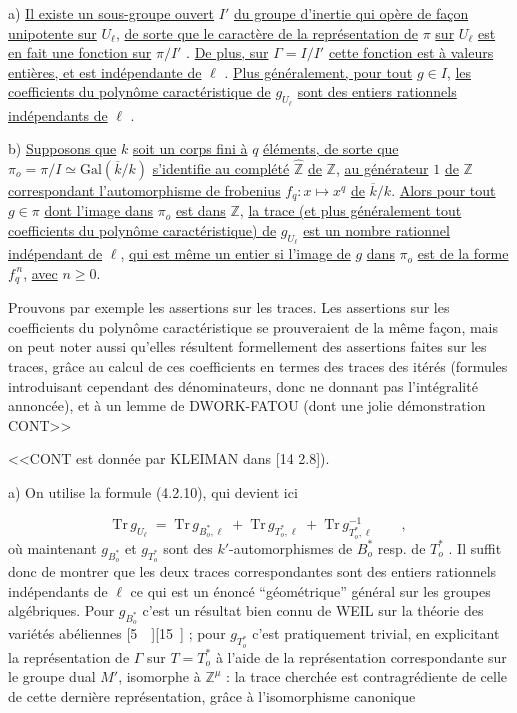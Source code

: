 a) \underline{Il existe un sous-groupe ouvert} $I'$ \underline{du groupe d'inertie qui opère de façon unipotente sur} $U_\ell$, \underline{de sorte que le caractère de la représentation de} $\pi$ \underline{sur} $U_\ell$ \underline{est en fait une fonction sur} $\pi/I'$ . \underline{De plus, sur} $\Gamma = I/I'$ \underline{cette fonction est à valeurs entières, et est indépendante de} $\ell$ . \underline{Plus généralement, pour tout} $g \in I$, \underline{les coefficients du polynôme caractéristique de} $g_{U_\ell}$ \underline{sont des entiers rationnels indépendants de} $\ell$ .

b) \underline{Supposons que} $k$ \underline{soit un corps fini à} $q$ \underline{éléments, de sorte que} $\pi_o = \pi/I \simeq \mathrm{Gal}(\overline{k}/k)$ \underline{s'identifie au complété} $\widehat{\mathbb{Z}}$ \underline{de} $\mathbb{Z}$, \underline{au générateur} $1$ \underline{de} $\mathbb{Z}$ \underline{correspondant l'automorphisme de frobenius} $f_q : x \longmapsto x^q$ \underline{de} $\overline{k}/k$. \underline{Alors pour tout} $g \in \pi$ \underline{dont l'image dans} $\pi_o$ \underline{est dans} $\mathbb{Z}$, \underline{la trace (et plus généralement tout coefficients du polynôme caractéristique) de} $g_{U_\ell}$ \underline{est un nombre rationnel indépendant de} $\ell$, \underline{qui est même un entier si l'image de} $g$ \underline{dans} $\pi_o$ \underline{est de la forme} $f_q^{\,n}$, \underline{avec} $n \geq 0$.

Prouvons par exemple les assertions sur les traces. Les assertions sur les coefficients du polynôme caractéristique se prouveraient de la même façon, mais on peut noter aussi qu'elles résultent formellement des assertions faites sur les traces, grâce au calcul de ces coefficients en termes des traces des itérés (formules introduisant cependant des dénominateurs, donc ne donnant pas l'intégralité annoncée), et à un lemme de DWORK-FATOU (dont une jolie démonstration CONT>>



<<CONT est donnée par KLEIMAN dans [14 2.8]).

a) On utilise la formule (4.2.10), qui devient ici

\begin{equation}\tag{4.3.0}
\mathrm{Tr}\, g_{U_\ell} \;=\; \mathrm{Tr}\, g_{B^{*}_{o},\ell} \;+\; \mathrm{Tr}\, g_{T^{*}_{o},\ell} \;+\; \mathrm{Tr}\, g^{-1}_{T^{*}_{o},\ell} \qquad ,
\end{equation}
où maintenant $g_{B^{*}_{o}}$ et $g_{T^{*}_{o}}$ sont des $k'$-automorphismes de $B^{*}_{o}$ resp. de $T^{*}_{o}$ . Il suffit donc de montrer que les deux traces correspondantes sont des entiers rationnels indépendants de $\ell$ ce qui est un énoncé ``géométrique'' général sur les groupes algébriques. Pour $g_{B^{*}_{o}}$ c'est un résultat bien connu de WEIL sur la théorie des variétés abéliennes [5\ \ ][15\ ] ; pour $g_{T^{*}_{o}}$ c'est pratiquement trivial, en explicitant la représentation de $\Gamma$ sur $T = T^{*}_{o}$ à l'aide de la représentation correspondante sur le groupe dual $M'$, isomorphe à $\mathbb{Z}^{\mu}$ : la trace cherchée est contragrédiente de celle de cette dernière représentation, grâce à l'isomorphisme canonique

